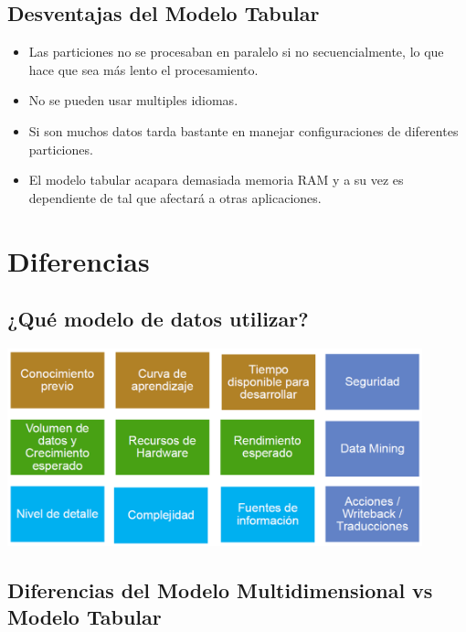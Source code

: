 \documentclass[preprint,12pt]{elsarticle}
\begin{document}
\subsection{Desventajas del Modelo Tabular}

\begin{itemize}
	\item Las particiones no se procesaban en paralelo si no secuencialmente, lo que hace que sea más lento el procesamiento.
	\item No se pueden usar multiples idiomas.
	\item Si son muchos datos tarda bastante en manejar configuraciones de diferentes particiones.
	\item El modelo tabular acapara demasiada memoria RAM y a su vez es dependiente de tal que afectará a otras aplicaciones.
\end{itemize}


\section{Diferencias}

\subsection{¿Qué modelo de datos utilizar? }

\begin{center}
	\includegraphics[width=12cm]{./Imagenes/dif0} 
\end{center}


\subsection{Diferencias del Modelo Multidimensional vs Modelo Tabular}
\end{document}
